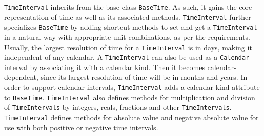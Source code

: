 
{\tt TimeInterval} inherits from the base class {\tt BaseTime}.  As such,
it gains the core representation of time as well as its associated methods.
{\tt TimeInterval} further specializes {\tt BaseTime} by adding shortcut
methods to set and get a {\tt TimeInterval} in a natural way with
appropriate unit combinations, as per the requirements.  Usually, the
largest resolution of time for a {\tt TimeInterval} is in days, making it
independent of any calendar.  A {\tt TimeInterval} can also be used as a
{\tt Calendar} interval by associating it with a calendar kind.  Then it
becomes calendar-dependent, since its largest resolution of time will be
in months and years.  In order to support calendar intervals,
{\tt TimeInterval} adds a calendar kind attribute to {\tt BaseTime}.
{\tt TimeInterval} also defines methods for multiplication and division
of {\tt TimeIntervals} by integers, reals, fractions and other
{\tt TimeIntervals}.  {\tt TimeInterval} defines methods for absolute
value and negative absolute value for use with both positive or
negative time intervals.
